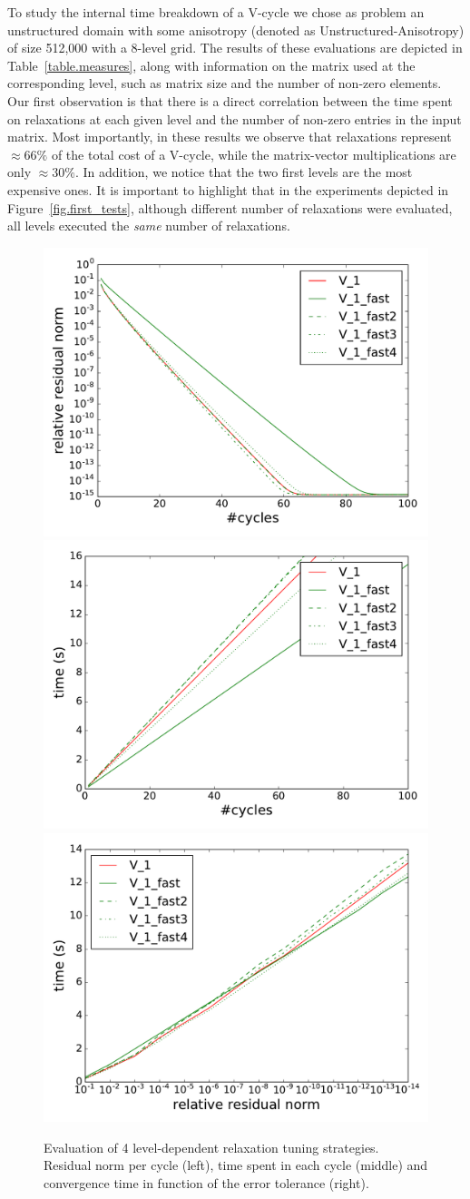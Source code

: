 To study the internal time breakdown of a V-cycle we chose as problem an
unstructured domain with some anisotropy (denoted as Unstructured-Anisotropy)
of size 512,000 with a 8-level grid. The results of these evaluations are
depicted in Table~\ref{table.measures}, along with information on the matrix
used at the corresponding level, such as matrix size and the number of non-zero
elements.  Our first observation is that there is a direct correlation between
the time spent on relaxations at each given level and the number of non-zero
entries in the input matrix. Most importantly, in these results we observe that
relaxations represent $\approx66\%$ of the total cost of a V-cycle, while the
matrix-vector multiplications are only $\approx30\%$. In addition, we notice
that the two first levels are the most expensive ones.  It is important to
highlight that in the experiments depicted in Figure~\ref{fig.first_tests},
although different number of relaxations were evaluated, all levels executed
the \emph{same} number of relaxations.

\begin{figure}
    \includegraphics[width=0.33\linewidth]{figs/convergence_fast_norm.pdf}
    \includegraphics[width=0.33\linewidth]{figs/convergence_fast_time.pdf}
    \includegraphics[width=0.33\linewidth]{figs/time_convergence_fast.pdf}
    \caption{Evaluation of 4 level-dependent relaxation tuning strategies.
    Residual norm per cycle (left), time spent in each cycle (middle) and
    convergence time in function of the error tolerance (right).}
    \label{fig.newstrat}
\end{figure}

